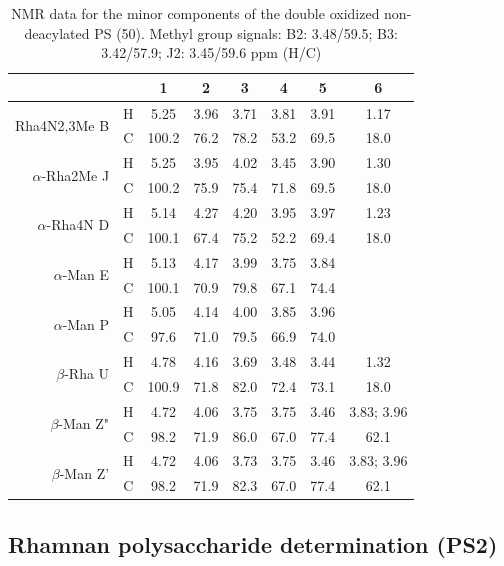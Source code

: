 		 \begin{table}[htb]
			 \centering
			 \caption[\Ac{NMR} data for the minor components of the double oxidized non-deacylated \ac{PS}]{\ac{NMR} data for the minor components of the double oxidized non-deacylated \ac{PS} (50\cel). Methyl group signals: B2: 3.48/59.5; B3: 3.42/57.9; J2: 3.45/59.6 ppm (H/C)}
			 \label{tbl:lpsends}
			 \begin{tabular}{@{}rccccccc@{}}
				 \toprule
				  &  & 1 & 2 & 3 & 4 & 5 & 6 \\ \midrule
				 \multirow{2}{*}{Rha4N2,3Me B} & H & 5.25 & 3.96 & 3.71 & 3.81 & 3.91 & 1.17 \\
				  & C & 100.2 & 76.2 & 78.2 & 53.2 & 69.5 & 18.0 \\
				 \multirow{2}{*}{$\alpha$-Rha2Me J} & H & 5.25 & 3.95 & 4.02 & 3.45 & 3.90 & 1.30 \\
				  & C & 100.2 & 75.9 & 75.4 & 71.8 & 69.5 & 18.0 \\
				 \multirow{2}{*}{$\alpha$-Rha4N D} & H & 5.14 & 4.27 & 4.20 & 3.95 & 3.97 & 1.23 \\
				  & C & 100.1 & 67.4 & 75.2 & 52.2 & 69.4 & 18.0 \\
				 \multirow{2}{*}{$\alpha$-Man E} & H & 5.13 & 4.17 & 3.99 & 3.75 & 3.84 &  \\
				  & C & 100.1 & 70.9 & 79.8 & 67.1 & 74.4 &  \\
				 \multirow{2}{*}{$\alpha$-Man P} & H & 5.05 & 4.14 & 4.00 & 3.85 & 3.96 &  \\
				  & C & 97.6 & 71.0 & 79.5 & 66.9 & 74.0 &  \\
				 \multirow{2}{*}{$\beta$-Rha U} & H & 4.78 & 4.16 & 3.69 & 3.48 & 3.44 & 1.32 \\
				  & C & 100.9 & 71.8 & 82.0 & 72.4 & 73.1 & 18.0 \\
				 \multirow{2}{*}{$\beta$-Man Z"} & H & 4.72 & 4.06 & 3.75 & 3.75 & 3.46 & 3.83; 3.96 \\
				  & C & 98.2 & 71.9 & 86.0 & 67.0 & 77.4 & 62.1 \\
				 \multirow{2}{*}{$\beta$-Man Z'} & H & 4.72 & 4.06 & 3.73 & 3.75 & 3.46 & 3.83; 3.96 \\
				  & C & 98.2 & 71.9 & 82.3 & 67.0 & 77.4 & 62.1 \\ \bottomrule 
			 \end{tabular}
		 \end{table}

	\subsection{Rhamnan polysaccharide determination (PS2)} %
	\label{sub:rhamnan_polysaccharide_determination_ps2_}

